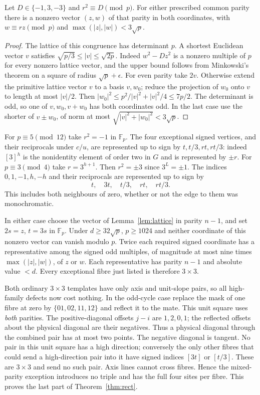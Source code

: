\documentclass[11pt]{article}
\newcommand{\F}{\mathbb F_p}\newcommand{\Z}{\mathbb Z}\newcommand{\B}{\mathcal B}\newcommand{\D}{\mathcal D}\newcommand{\A}{\mathcal A}\newcommand{\ch}{\chi}\newcommand{\eps}{\varepsilon}
\begin{document}
\begin{lemma}\label{lem:lattice}
Let $D\in\{-1,3,-3\}$ and $r^2\equiv D\pmod p$. For either prescribed common parity there is a nonzero vector $(z,w)$ of that parity in both coordinates, with $w\equiv rz\pmod p$ and $\max(|z|,|w|)<3\sqrt p$.
\end{lemma}
\begin{proof} The lattice of this congruence has determinant $p$. A shortest Euclidean vector $v$ satisfies $\sqrt{p/3}\le|v|\le\sqrt{2p}$. Indeed $w^2-Dz^2$ is a nonzero multiple of $p$ for every nonzero lattice vector, and the upper bound follows from Minkowski's theorem on a square of radius $\sqrt p+\epsilon$. For even parity take $2v$. Otherwise extend the primitive lattice vector $v$ to a basis $v,w_0$; reduce the projection of $w_0$ onto $v$ to length at most $|v|/2$. Then $|w_0|^2\le p^2/|v|^2+|v|^2/4\le 7p/2$. The determinant is odd, so one of $v,w_0,v+w_0$ has both coordinates odd. In the last case use the shorter of $v\pm w_0$, of norm at most $\sqrt{|v|^2+|w_0|^2}<3\sqrt p$.\end{proof}

For $p\equiv5\pmod{12}$ take $r^2=-1$ in $\F$. The four exceptional signed vertices, and their reciprocals under $c/u$, are represented up to sign by $t,t/3,rt,rt/3$: indeed $[3]^h$ is the nonidentity element of order two in $G$ and is represented by $\pm r$. For $p\equiv3\pmod4$ take $r=3^{h+1}$. Then $r^2=\pm3$ since $3^L=\pm1$. The indices $0,1,-1,h,-h$ and their reciprocals are represented up to sign by
\[
                         t,\quad 3t,\quad t/3,\quad rt,\quad rt/3.
\]
This includes both neighbours of zero, whether or not the edge to them was monochromatic.

In either case choose the vector of Lemma~\ref{lem:lattice} in parity $n-1$, and set $2s=z$, $t=3s$ in $\F$. Under $d\ge32\sqrt p$, $p\ge1024$ and neither coordinate of this nonzero vector can vanish modulo $p$. Twice each required signed coordinate has a representative among the signed odd multiples, of magnitude at most nine times $\max(|z|,|w|)$, of $z$ or $w$. Each representative has parity $n-1$ and absolute value $<d$. Every exceptional fibre just listed is therefore $3\times3$.

Both ordinary $3\times3$ templates have only axis and unit-slope pairs, so all high-family defects now cost nothing. In the odd-cycle case replace the mask of one fibre at zero by $\{01,02,11,12\}$ and reflect it to the mate. This unit square uses \emph{both} parities. The positive-diagonal offsets $j-i$ are $1,2,0,1$; the reflected offsets about the physical diagonal are their negatives. Thus a physical diagonal through the combined pair has at most two points. The negative diagonal is tangent. No pair in this unit square has a high direction; conversely the only other fibres that could send a high-direction pair into it have signed indices $[3t]$ or $[t/3]$. These are $3\times3$ and send no such pair. Axis lines cannot cross fibres. Hence the mixed-parity exception introduces no triple and has the full four sites per fibre. This proves the last part of Theorem~\ref{thm:rect}.
\end{document}
